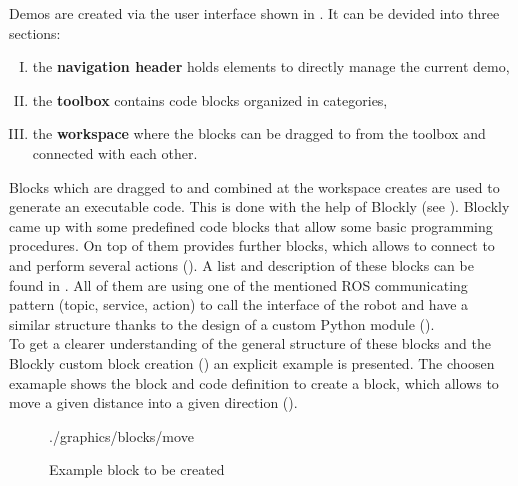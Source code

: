 Demos are created via the user interface shown in . It can be devided into three sections:

\begin{enumerate}[I.]
	\item the \textbf{navigation header} holds elements to directly manage the current demo,
	\item the \textbf{toolbox} contains code blocks organized in categories,
	\item the \textbf{workspace} where the blocks can be dragged to from the toolbox and connected with each other.
\end{enumerate}

Blocks which are dragged to and combined at the workspace creates are used to generate an executable code. This is done with the help of Blockly (see ). Blockly came up with some predefined code blocks that allow some basic programming procedures.
On top of them \toolname{} provides further blocks, which allows to connect to \hobbit{} and perform several actions (). A list and description of these blocks can be found in . All of them are using one of the mentioned ROS communicating pattern (topic, service, action) to call the interface of the robot and have a similar structure thanks to the design of a custom Python module (). \\

To get a clearer understanding of the general structure of these blocks and the Blockly custom block creation () an explicit example is presented. The choosen examaple shows the block and code definition to create a block, which allows to move \hobbit{} a given distance into a given direction ().

\begin{figure}[htbp]
	\centering
	\begin{overpic}[width=0.3\linewidth]{./graphics/blocks/move}
	\end{overpic}
	\caption{Example block to be created}%
	\label{fig:ExBlockMove}%
\end{figure}

